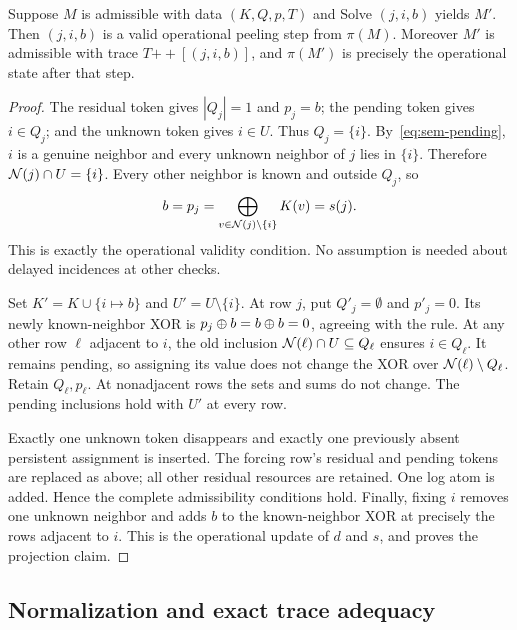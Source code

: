\begin{lem}
\label{lem:sem-solve}
Suppose $M$ is admissible with data $(K,Q,p,T)$ and Solve $(j,i,b)$ yields
$M'$. Then $(j,i,b)$ is a valid operational peeling step from $\pi(M)$.
Moreover $M'$ is admissible with trace $T\mathbin{+\!+}[(j,i,b)]$, and
$\pi(M')$ is precisely the operational state after that step.
\end{lem}
\begin{proof}
The residual token gives $|Q_j|=1$ and $p_j=b$; the pending token gives
$i\in Q_j$; and the unknown token gives $i\in U$. Thus $Q_j=\{i\}$.
By~\eqref{eq:sem-pending}, $i$ is a genuine neighbor and every unknown
neighbor of $j$ lies in $\{i\}$. Therefore $\mathcal{N}(j)\cap U=\{i\}$.
Every other neighbor is known and outside $Q_j$, so
\[
 b=p_j=\bigoplus_{v\in\mathcal{N}(j)\setminus\{i\}}K(v)=s(j).
\]
This is exactly the operational validity condition. No assumption is needed
about delayed incidences at other checks.

Set $K'=K\cup\{i\mapsto b\}$ and $U'=U\setminus\{i\}$.
At row $j$, put $Q'_j=\emptyset$ and $p'_j=0$. Its newly known-neighbor XOR
is $p_j\oplus b=b\oplus b=0$, agreeing with the rule. At any other row $\ell$
adjacent to $i$, the old inclusion $\mathcal{N}(\ell)\cap U\subseteq Q_\ell$
ensures $i\in Q_\ell$. It remains pending, so assigning its value does not
change the XOR over $\mathcal{N}(\ell)\setminus Q_\ell$. Retain $Q_\ell,p_\ell$.
At nonadjacent rows the sets and sums do not change. The pending inclusions
hold with $U'$ at every row.

Exactly one unknown token disappears and exactly one previously absent
persistent assignment is inserted. The forcing row's residual and pending
tokens are replaced as above; all other residual resources are retained.
One log atom is added. Hence the complete admissibility conditions hold.
Finally, fixing $i$ removes one unknown neighbor and adds $b$ to the
known-neighbor XOR at precisely the rows adjacent to $i$. This is the
operational update of $d$ and $s$, and proves the projection claim.
\end{proof}

\subsection{Normalization and exact trace adequacy}
\label{sec:sem-adequacy}

